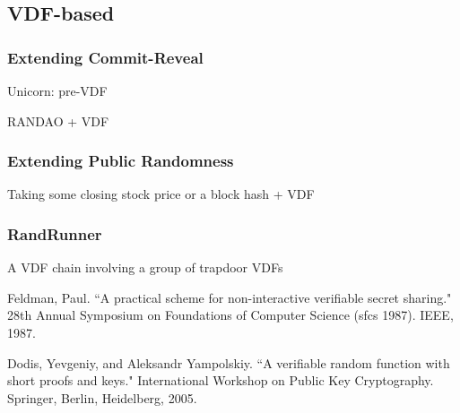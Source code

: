 \documentclass[11pt]{article}
\theoremstyle{definition}
\theoremstyle{remark}
\begin{document}
\subsection{VDF-based}
\subsubsection{Extending Commit-Reveal}
Unicorn: pre-VDF

RANDAO + VDF
\subsubsection{Extending Public Randomness}
Taking some closing stock price or a block hash + VDF
\subsubsection{RandRunner}
A VDF chain involving a group of trapdoor VDFs

\newpage
\begin{thebibliography}{20}
Feldman, Paul. ``A practical scheme for non-interactive verifiable secret sharing." 28th Annual Symposium on Foundations of Computer Science (sfcs 1987). IEEE, 1987.

Dodis, Yevgeniy, and Aleksandr Yampolskiy. ``A verifiable random function with short proofs and keys." International Workshop on Public Key Cryptography. Springer, Berlin, Heidelberg, 2005.
\end{thebibliography}
\end{document}
